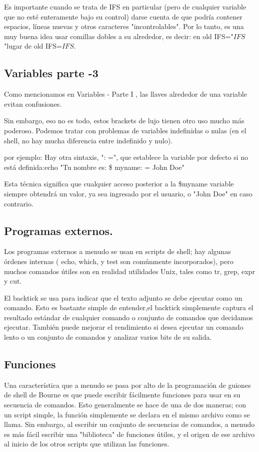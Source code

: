 \documentclass{article}
\begin{document}
\begin{itemize}
Es importante cuando se trata de IFS en particular (pero de cualquier variable que no esté enteramente bajo su control) darse cuenta de que podría contener espacios, líneas nuevas y otros caracteres "incontrolables". Por lo tanto, es una muy buena idea usar comillas dobles a su alrededor, es decir: en old IFS="$IFS$"lugar de old IFS=$IFS$.


\subsection{Variables parte -3}

Como mencionamos en Variables - Parte I , las llaves alrededor de una variable evitan confusiones.

Sin embargo, eso no es todo, estos brackets de lujo tienen otro uso mucho más poderoso. Podemos tratar con problemas de variables indefinidas o nulas (en el shell, no hay mucha diferencia entre indefinido y nulo).

por ejemplo: Hay otra sintaxis, ": =", que establece la variable por defecto si no está definida:echo "Tu nombre es: \$ {myname: = John Doe}"

Esta técnica significa que cualquier acceso posterior a la \$myname variable siempre obtendrá un valor, ya sea ingresado por el usuario, o "John Doe" en caso contrario.


\subsection{Programas externos.}

Los programas externos a menudo se usan en scripts de shell; hay algunas órdenes internas ( echo, which, y test son comúnmente incorporados), pero muchos comandos útiles son en realidad utilidades Unix, tales como tr, grep, expr y cut.


El backtick se usa para indicar que el texto adjunto se debe ejecutar como un comando. Esto es bastante simple de entender,el backtick simplemente captura el resultado estándar de cualquier comando o conjunto de comandos que decidamos ejecutar. También puede mejorar el rendimiento si desea ejecutar un comando lento o un conjunto de comandos y analizar varios bits de su salida.

\subsection{Funciones}

Una característica que a menudo se pasa por alto de la programación de guiones de shell de Bourne es que puede escribir fácilmente funciones para usar en su secuencia de comandos. Esto generalmente se hace de una de dos maneras; con un script simple, la función simplemente se declara en el mismo archivo como se llama. 
Sin embargo, al escribir un conjunto de secuencias de comandos, a menudo es más fácil escribir una "biblioteca" de funciones útiles, y el origen de ese archivo al inicio de los otros scripts que utilizan las funciones.


\end{itemize}
\end{document}
